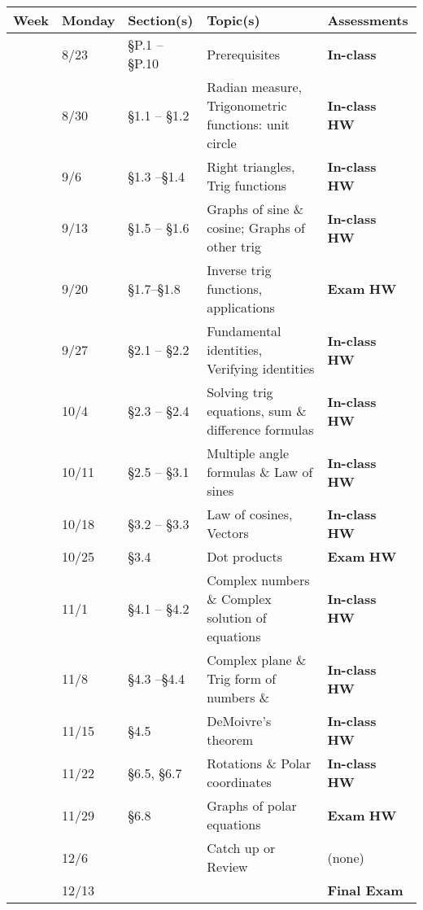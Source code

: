 \documentclass[12pt]{article}
\newcounter{qz}\setcounter{qz}{0}
\newcommand{\qz}{%
\setcounter{qz}{\value{qz}+1}
\textbf{In-class  \theqz} \,}
\newcounter{hw}\setcounter{hw}{0}
\newcommand{\hw}{%
\setcounter{hw}{\value{hw}+1}
\textbf{HW \thehw} \,\,}
\newcounter{ex}\setcounter{ex}{0}
\newcommand{\ex}{%
\setcounter{ex}{\value{ex}+1}
Exam \theex}
\newcounter{wk}\setcounter{wk}{0}
\newcommand{\wk}{%
\setcounter{wk}{\value{wk}+1}
\thewk \,\,}
\begin{document}
\begin{center}
    \small
\begin{tabular}  {|l|l|l|l|l|}
\hline
{\bf Week}  & \textbf{Monday} &  {\bf Section(s)} & {\bf Topic(s)} & \textbf{Assessments} \\
\hline \hline 
\wk    & 8/23 &    \S P.1 -- \S P.10   & Prerequisites & \qz  \\
\wk    & 8/30  &  \S1.1 -- \S1.2  &  Radian measure, Trigonometric functions: unit circle  & \qz \hw  \\
\wk    & 9/6 &     \S1.3 --\S1.4  &   Right triangles, Trig functions  & \qz \hw \\
\wk    & 9/13  &     \S1.5 -- \S1.6  & Graphs of sine \& cosine; Graphs of other trig  & \qz \hw            \\
\wk    & 9/20 &  \S1.7--\S1.8    &  Inverse trig functions, applications    & \textbf{\ex} \hw \\ \hline
\wk    & 9/27   & \S2.1 -- \S2.2   & Fundamental identities,  Verifying identities &  \qz \hw  \\
\wk    & 10/4     & \S2.3 -- \S2.4  &  Solving trig equations, sum \& difference formulas & \qz \hw  \\
\wk   & 10/11   & \S2.5 -- \S3.1  &  Multiple angle formulas \& Law of sines     & \qz \hw  \\
\wk  &  10/18   & \S3.2 -- \S3.3 &  Law of cosines,  Vectors   & \qz  \hw \\ 
\wk &  10/25     &   \S3.4& Dot products  &  \textbf{\ex}  \hw \\ \hline
\wk  & 11/1  &   \S4.1 -- \S4.2 & Complex numbers \&  Complex solution of equations   & \qz  \hw  \\
\wk   & 11/8  & \S4.3 --\S4.4  & Complex plane \&  Trig form of numbers    \&  & \qz \hw \\
\wk   & 11/15& \S4.5  &  DeMoivre's theorem    & \qz \hw  \\
\wk   & 11/22   &  \S6.5, \S6.7     & Rotations \& Polar coordinates & \qz  \hw   \\
\wk   & 11/29    &  \S6.8      &  Graphs of polar equations   & \textbf{\ex} \hw   \\ \hline
\wk   & 12/6      &  & Catch up or Review        & (none) \\  \hline
\wk   & 12/13      &  &     \hfill  & \textbf{ Final Exam}  \\  \hline
   
\end{tabular}
\end{center}
\end{document}
